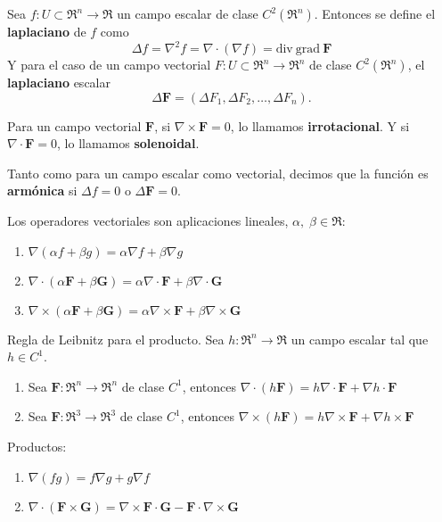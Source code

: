 \begin{definition}
    Sea $f:U\subset\Re^n\to\Re$ un campo escalar de clase $C^2(\Re^n)$. Entonces se define el \textbf{laplaciano} de $f$ como
    \[
        \Delta f=\nabla^2f=\nabla\cdot(\nabla f)=\text{div}\:\text{grad}\:\mathbf{F}  
    \]
    Y para el caso de un campo vectorial $F:U\subset\Re^n\to\Re^n$ de clase $C^2(\Re^n)$, el \textbf{laplaciano} escalar
    \[
        \Delta\mathbf{F}=(\Delta F_1,\Delta F_2,\ldots,\Delta F_n).  
    \]
\end{definition}
\begin{definition}
    Para un campo vectorial $\mathbf{F}$, si $\nabla\times\mathbf{F}=0$, lo llamamos \textbf{irrotacional}. Y si $\nabla\cdot\mathbf{F}=0$, lo llamamos \textbf{solenoidal}.
\end{definition}
\begin{definition}
    Tanto como para un campo escalar como vectorial, decimos que la funci\'on es \textbf{arm\'onica} si $\Delta f=0$ o $\Delta \mathbf{F}=0$.
\end{definition}
\begin{propertie}
    Los operadores vectoriales son aplicaciones lineales, $\alpha,\;\beta\in\Re$:
    \begin{enumerate}
        \item \(\nabla(\alpha f+\beta g)=\alpha\nabla f+\beta\nabla g\)
        \item \(\nabla\cdot(\alpha \mathbf{F}+\beta \mathbf{G})=\alpha\nabla\cdot\mathbf{F}+\beta\nabla\cdot\mathbf{G}\)
        \item \(\nabla\times(\alpha \mathbf{F}+\beta \mathbf{G})=\alpha\nabla\times\mathbf{F}+\beta\nabla\times\mathbf{G}\)
    \end{enumerate}
\end{propertie}
\begin{propertie}
    Regla de Leibnitz para el producto. Sea $h:\Re^n\to\Re$ un campo escalar tal que $h\in C^1$.
    \begin{enumerate}
        \item Sea $\mathbf{F}:\Re^n\to\Re^n$ de clase $C^1$, entonces $\nabla\cdot(h\mathbf{F})=h\nabla\cdot\mathbf{F}+\nabla h\cdot\mathbf{F}$
        \item Sea $\mathbf{F}:\Re^3\to\Re^3$ de clase $C^1$, entonces $\nabla\times(h\mathbf{F})=h\nabla\times\mathbf{F}+\nabla h\times\mathbf{F}$
    \end{enumerate}
\end{propertie}
\begin{propertie}
    Productos:
    \begin{enumerate}
        \item $\nabla(fg)=f\nabla g+g\nabla f$
        \item $\nabla\cdot(\mathbf{F}\times\mathbf{G})=\nabla\times\mathbf{F}\cdot\mathbf{G}-\mathbf{F}\cdot\nabla\times\mathbf{G}$
    \end{enumerate}
\end{propertie}